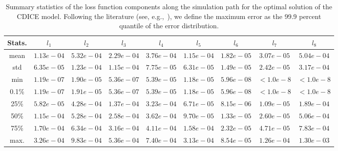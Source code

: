 \documentclass[11pt, a4paper, pdftex, twoside, dvipsnames]{article}
\begin{document}
\begin{appendices}
\begin{table}[H]
\centering
\begin{tabular}{ c c c c c c c c c  } 
 \toprule
 Stats. & $l_1$       & $l_2$      & $l_3$    & $l_4$     & $l_5$      & $l_6$     & $l_7$     & $l_8$ \\ 
 \midrule
 mean & $1.13e-04$ & $5.32e-04$  & $2.29e-04$ & $3.76e-04$ & $1.15e-04$ & $1.82e-05$ & $3.07e-05$ & $5.04e-04$\\
std & $6.35e-05$ & $1.23e-04$  & $1.15e-04$ & $7.75e-05$ & $6.31e-05$ & $1.49e-05$ & $2.42e-05$ & $3.17e-04$\\
min & $1.19e-07$ & $1.90e-05$  & $5.36e-07$ & $5.39e-05$ & $1.18e-05$ & $5.96e-08$ & $<1.0e-8$ & $<1.0e-8$\\
0.1\% & $1.19e-07$ & $1.91e-05$  & $5.36e-07$ & $5.39e-05$ & $1.18e-05$ & $5.96e-08$ & $<1.0e-8$ & $<1.0e-8$\\
25\% & $5.82e-05$ & $4.28e-04$  & $1.37e-04$ & $3.23e-04$ & $6.71e-05$ & $8.15e-06$ & $1.09e-05$ & $1.89e-04$\\
50\% & $1.15e-04$ & $5.28e-04$  & $2.58e-04$ & $3.62e-04$ & $9.70e-05$ & $1.33e-05$ & $2.60e-05$ & $5.06e-04$ \\
75\% & $1.70e-04$ & $6.34e-04$  & $3.16e-04$ & $4.11e-04$ & $1.58e-04$ & $2.32e-05$ & $4.71e-05$ & $7.83e-04$\\
max. & $3.26e-04$ & $9.83e-04$  & $5.36e-04$ & $7.40e-04$ & $3.13e-04$ & $8.54e-05$ & $1.26e-04$ & $1.30e-03$\\
 \bottomrule
\end{tabular}
\caption{Summary statistics of the loss function components along the simulation path for the optimal solution of the CDICE model. Following the literature (see, e.g.,~\cite{https://doi.org/10.3982/ECTA12216}), we define the maximum error as the 99.9 percent quantile of the error distribution.}
\label{table:error}
\end{table}



\end{appendices}

\newpage

\end{document}
